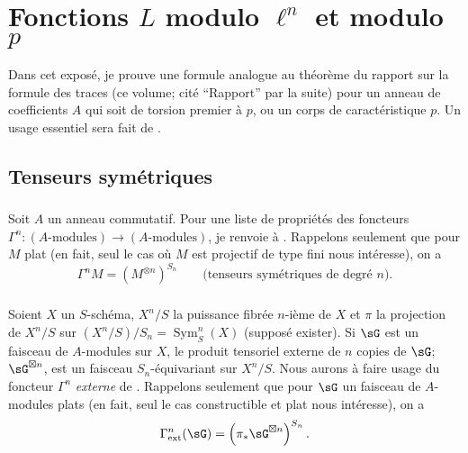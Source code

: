 
\chapter{Fonctions \texorpdfstring{$L$}{L} modulo \texorpdfstring{$\ell^n$}{l n} et modulo \texorpdfstring{$p$}{p}}\label{III}

Dans cet exposé, je prouve une formule analogue au théorème du rapport sur 
la formule des traces (ce volume; cité ``Rapport'' par la suite) pour un 
anneau de coefficients $A$ qui soit de torsion premier à $p$, ou un corps de 
caractéristique $p$. Un usage essentiel sera fait de \cite[XVII 5.5]{sga4}. 










\section{Tenseurs symétriques}\label{III:1}





\subsection{}\label{III:1-1}

Soit $A$ un anneau commutatif. Pour une liste de propriétés des foncteurs 
$\Gamma^n:(\text{$A$-modules})\to (\text{$A$-modules})$, je renvoie à 
\cite[XVII 5.5.1 et 2]{sga4}. Rappelons seulement que pour $M$ plat (en fait, seul 
le cas où $M$ est projectif de type fini nous intéresse), on a 
\[
  \Gamma^n M = \left(M^{\otimes n}\right)^{S_n} \qquad \text{(tenseurs symétriques de degré $n$).}
\]





\subsection{}\label{III:1-2}

Soient $X$ un $S$-schéma, $X^n/S$ la puissance fibrée $n$-ième de $X$ et 
$\pi$ la projection de $X^n/S$ sur $(X^n/S)/S_n=\operatorname{Sym}_S^n(X)$ 
(supposé exister). Si $\sG$ est un faisceau de $A$-modules sur $X$, le 
produit tensoriel externe de $n$ copies de $\sG$; $\sG^{\boxtimes n}$, est un 
faisceau $S_n$-équivariant sur $X^n/S$. Nous aurons à faire usage du 
foncteur $\Gamma^n$ \emph{externe} de \cite[XVII 5.5.7 à 9]{sga4}. Rappelons 
seulement que pour $\sG$ un faisceau de $A$-modules plats (en fait, seul le cas 
constructible et plat nous intéresse), on a 
\[
  \Gamma_\text{ext}^n(\sG) = \left(\pi_*\sG^{\boxtimes n}\right)^{S_n} \text{.}
\]





